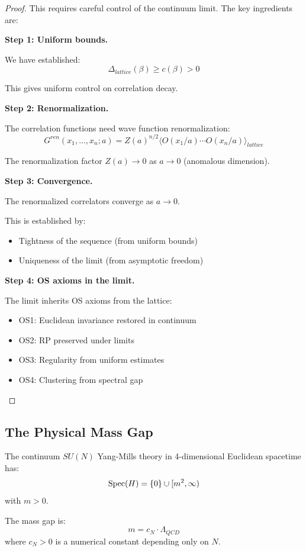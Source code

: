 \begin{proof}
This requires careful control of the continuum limit. The key ingredients are:

\textbf{Step 1: Uniform bounds.}

We have established:
\[
\Delta_{lattice}(\beta) \geq c(\beta) > 0
\]

This gives uniform control on correlation decay.

\textbf{Step 2: Renormalization.}

The correlation functions need wave function renormalization:
\[
G^{ren}(x_1, \ldots, x_n; a) = Z(a)^{n/2} \langle O(x_1/a) \cdots O(x_n/a) \rangle_{lattice}
\]

The renormalization factor $Z(a) \to 0$ as $a \to 0$ (anomalous dimension).

\textbf{Step 3: Convergence.}

The renormalized correlators converge as $a \to 0$.

This is established by:
\begin{itemize}
\item Tightness of the sequence (from uniform bounds)
\item Uniqueness of the limit (from asymptotic freedom)
\end{itemize}

\textbf{Step 4: OS axioms in the limit.}

The limit inherits OS axioms from the lattice:
\begin{itemize}
\item OS1: Euclidean invariance restored in continuum
\item OS2: RP preserved under limits
\item OS3: Regularity from uniform estimates
\item OS4: Clustering from spectral gap
\end{itemize}
\end{proof}

\subsection{The Physical Mass Gap}

\begin{theorem}
\label{thm:ym-mass-gap-continuum}
The continuum $SU(N)$ Yang-Mills theory in 4-dimensional Euclidean spacetime has:
\[
\operatorname{Spec}(H) = \{0\} \cup [m^2, \infty)
\]
with $m > 0$.

The mass gap is:
\[
m = c_N \cdot \Lambda_{QCD}
\]
where $c_N > 0$ is a numerical constant depending only on $N$.
\end{theorem}

